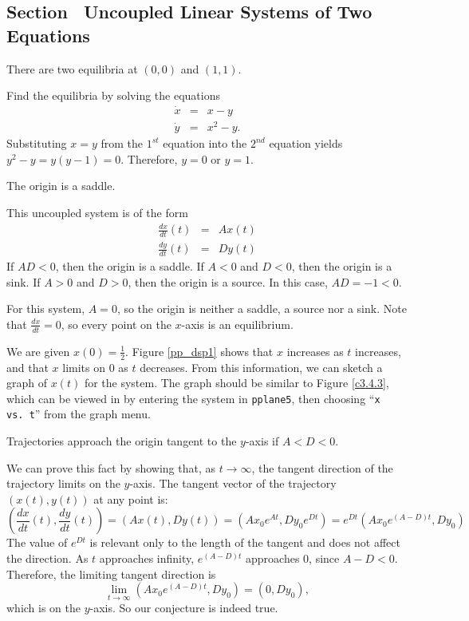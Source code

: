 \documentclass{ximera}
\begin{document}
\newpage
\subsection*{Section~\protect{\ref{sec:UncoupledLS}} Uncoupled Linear
Systems of Two Equations}

 \ans There are two equilibria at $(0,0)$ and $(1,1)$.

\soln Find the equilibria by solving the equations
\begin{eqnarray*}
\dot{x} & = & x-y\\
\dot{y} & = & x^2-y.
\end{eqnarray*}
Substituting $x=y$ from the $1^{st}$ equation into the $2^{nd}$ equation
yields $y^2-y = y(y-1)=0$.  Therefore, $y=0$ or $y=1$.

\ans The origin is a saddle.

\soln This uncoupled system is of the form
\[
\begin{array}{rcl}
\frac{dx}{dt}(t) & = & Ax(t) \\
\frac{dy}{dt}(t) & = & Dy(t)\end{array}
\]
If $AD < 0$, then the origin is a saddle.  If $A < 0$ and
$D < 0$, then the origin is a sink.  If $A > 0$ and $D > 0$, then
the origin is a source.  In this case, $AD = -1 < 0$.

 For this system, $A = 0$, so the origin is neither a
saddle, a source nor a sink.  Note that $\frac{dx}{dt} = 0$, so every
point on the $x$-axis is an equilibrium.

We are given $x(0) = \frac{1}{2}$.  Figure \ref{pp_dsp1}
shows that $x$ increases as $t$
increases, and that $x$ limits on $0$ as $t$ decreases.  From
this information, we can sketch a graph of $x(t)$ for the system.
The graph should be similar to Figure \ref{c3.4.3}, which can
be viewed in \Matlab by entering the system in {\tt pplane5},
then choosing ``{\tt x vs.\ t}'' from the graph menu.

\begin{figure}[htb]
                       \centerline{%
                       }
\end{figure}

\ans Trajectories approach the origin tangent to the $y$-axis if
$A < D < 0$. 

\soln We can prove this fact by showing that, as $t \rightarrow \infty$,
the tangent direction of the trajectory limits on the $y$-axis.  The
tangent vector of the trajectory $(x(t),y(t))$ at any point is:
\[ \left(\frac{dx}{dt}(t), \frac{dy}{dt}(t)\right) = \left(Ax(t),
Dy(t)\right) = \left(Ax_0e^{At}, Dy_0e^{Dt}\right) =
e^{Dt}\left(Ax_0e^{(A - D)t}, Dy_0\right) \]
The value of $e^{Dt}$ is relevant only to the length of the
tangent and does not affect the direction.  As $t$ approaches
infinity, $e^{(A - D)t}$ approaches $0$, since $A - D < 0$.
Therefore, the limiting tangent direction is
\[ \lim_{t \rightarrow \infty} \left(Ax_0e^{(A - D)t}, Dy_0\right)
= (0, Dy_0), \]
which is on the $y$-axis.  So our conjecture is indeed true.
\end{document}
